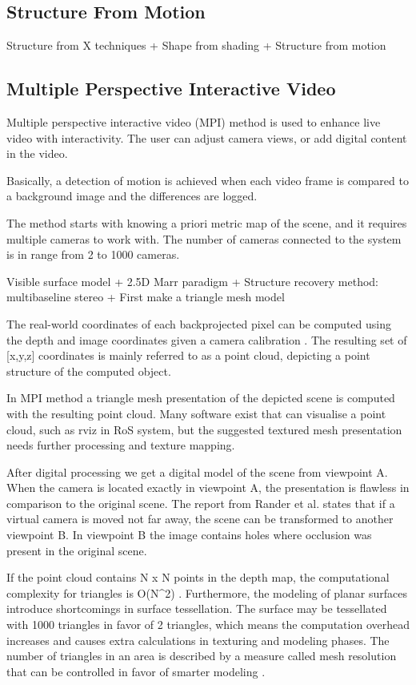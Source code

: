 \documentclass[12pt,a4paper,oneside,pdftex]{report}
\begin{document}
{\subsection{Structure From Motion}
\label{subsection:structure_from_motion}

Structure from X techniques
+ Shape from shading
+ Structure from motion

\subsection{Multiple Perspective Interactive Video}

Multiple perspective interactive video (MPI) method is used to enhance live video with interactivity. The user can adjust camera views, or add digital content in the video. 

Basically, a detection of motion is achieved when each video frame is compared to a background image and the differences are logged. 

The method starts with knowing a priori metric map of the scene, and it requires multiple cameras to work with. The number of cameras connected to the system is in range from 2 to 1000 cameras.

Visible surface model
+ 2.5D Marr paradigm
+ Structure recovery method: multibaseline stereo
+ First make a triangle mesh model 

The real-world coordinates of each backprojected pixel can be computed using the depth and image coordinates given a camera calibration \cite{Rander97}. The resulting set of [x,y,z] coordinates is mainly referred to as a point cloud, depicting a point structure of the computed object.

In MPI method a triangle mesh presentation of the depicted scene is computed with the resulting point cloud. Many software exist that can visualise a point cloud, such as rviz in RoS system, but the suggested textured mesh presentation needs further processing and texture mapping. 

After digital processing we get a digital model of the scene from viewpoint A. When the camera is located exactly in viewpoint A, the presentation is flawless in comparison to the original scene. The report from Rander et al. \cite{Rander97} states that if a virtual camera is moved not far away, the scene can be transformed to another viewpoint B. In viewpoint B the image contains holes where occlusion was present in the original scene.

If the point cloud contains N x N points in the depth map, the computational complexity for triangles is O(N^2) \cite{Rander97}. Furthermore, the modeling of planar surfaces introduce shortcomings in surface tessellation. The surface may be tessellated with 1000 triangles in favor of 2 triangles, which means the computation overhead increases and causes extra calculations in texturing and modeling phases. The number of triangles in an area is described by a measure called mesh resolution that can be controlled in favor of smarter modeling \cite{Johnson96}.






}
\end{document}
